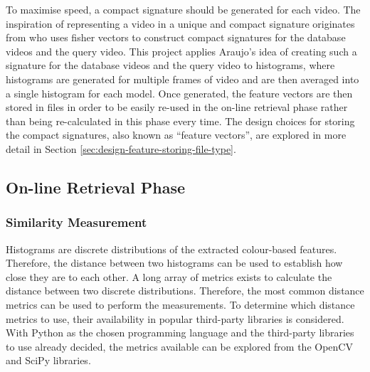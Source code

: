 To maximise speed, a compact signature should be generated for each video. The inspiration of representing a video in a unique and compact signature originates from \cite{araujo2017i2v} who uses fisher vectors to construct compact signatures for the database videos and the query video. This project applies Araujo's idea of creating such a signature for the database videos and the query video to histograms, where histograms are generated for multiple frames of video and are then averaged into a single histogram for each model. Once generated, the feature vectors are then stored in files in order to be easily re-used in the on-line retrieval phase rather than being re-calculated in this phase every time. The design choices for storing the compact signatures, also known as ``feature vectors'', are explored in more detail in Section \ref{sec:design-feature-storing-file-type}. 


\subsection{On-line Retrieval Phase}
\label{sec:design-online-retrieval}

\subsubsection{Similarity Measurement}
\label{sec:design-online-retrieval-similarity-measurement}

Histograms are discrete distributions of the extracted colour-based features. Therefore, the distance between two histograms can be used to establish how close they are to each other. A long array of metrics exists to calculate the distance between two discrete distributions. Therefore, the most common distance metrics can be used to perform the measurements. To determine which distance metrics to use, their availability in popular third-party libraries is considered. With Python as the chosen programming language and the third-party libraries to use already decided, the metrics available can be explored from the OpenCV and SciPy libraries.\\

